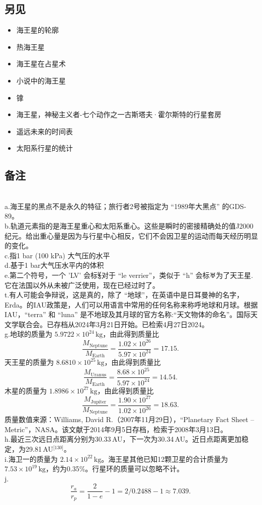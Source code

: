 \subsection{另见}
\begin{itemize}
\item 海王星的轮廓
\item 热海王星
\item 海王星在占星术
\item 小说中的海王星
\item 镎
\item 海王星，神秘主义者-七个动作之一古斯塔夫·霍尔斯特的行星套房
\item 遥远未来的时间表
\item 太阳系行星的统计
\end{itemize}
\subsection{备注}\\
a.海王星的黑点不是永久的特征；旅行者2号被指定为 “1989年大黑点” 的GDS-89。\\
b.轨道元素指的是海王星重心和太阳系重心。这些是瞬时的密接精确处的值J2000纪元。给出重心量是因为与行星中心相反，它们不会因卫星的运动而每天经历明显的变化。\\
c.指1 bar (100 kPa) 大气压的水平\\
d.基于1 bar大气压水平内的体积\\
e.第二个符号，一个 'LV' 会标⯉对于 “le verrier”，类似于 “h” 会标♅为了天王星.它在法国以外从未被广泛使用，现在已经过时了。\\
t.有人可能会争辩说，这是真的，除了 “地球”，在英语中是日耳曼神的名字，Erda。的IAU政策是，人们可以用语言中常用的任何名称来称呼地球和月球。根据IAU，“terra” 和 “luna” 是不地球及其月球的官方名称:“天文物体的命名”。国际天文学联合会。已存档从2024年3月21日开始。已检索4月27日2024。\\
g.地球的质量为 \(5.9722\times10^{24}\,\text{kg}\)，由此得到质量比
\[
\frac{M_{\text{Neptune}}}{M_{\text{Earth}}}
=
\frac{1.02\times10^{26}}{5.97\times10^{24}}
=
17.15.~
\]
天王星的质量为 \(8.6810\times10^{25}\,\text{kg}\)，由此得到质量比
\[
\frac{M_{\text{Uranus}}}{M_{\text{Earth}}}
=
\frac{8.68\times10^{25}}{5.97\times10^{24}}
=
14.54.~
\]
木星的质量为 \(1.8986\times10^{27}\,\text{kg}\)，由此得到质量比
\[
\frac{M_{\text{Jupiter}}}{M_{\text{Neptune}}}
=
\frac{1.90\times10^{27}}{1.02\times10^{26}}
=
18.63.~
\]
质量数值来源：Williams, David R.（2007年11月29日），“Planetary Fact Sheet – Metric”，NASA。该文献于2014年9月5日存档，检索于2008年3月13日。\\
h.最近三次远日点距离分别为30.33\,AU，下一次为30.34\,AU。近日点距离更加稳定，为29.81\,AU\(^\text{[130]}\)。\\
i.海卫一的质量为 \(2.14\times10^{22}\,\text{kg}\)。海王星其他已知12颗卫星的合计质量为 \(7.53\times10^{19}\,\text{kg}\)，约为0.35\%。行星环的质量可以忽略不计。\\
j.\[
\frac{r_{a}}{r_{p}}
=
\frac{2}{1-e}-1
=
2/0.2488 - 1
\approx 7.039.~
\]
